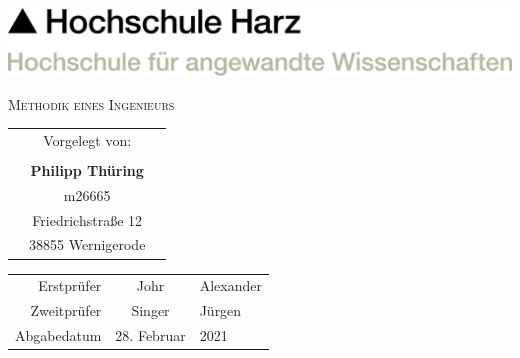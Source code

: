 
    \begin{center}   
        \includegraphics[width=0.5\paperwidth]{graphics/HSHARZ.png}
        \vspace{35mm}

        \Huge{\textsc{Methodik eines Ingenieurs}} 
        \normalsize
    
        \vspace{50mm}
    
        \begin{tabular}{r c l} 
            & Vorgelegt von: & \\
            && \\
            & \textbf{Philipp Thüring} &\\
             & m26665 & \\
             & Friedrichstraße 12 & \\
             & 38855 Wernigerode & \\
             
        \end{tabular}
    
        \vfill
        \begin{tabular}{r c l}
            Erstprüfer & Johr & Alexander \\
            Zweitprüfer & Singer & Jürgen \\
            Abgabedatum & 28. Februar & 2021 \\
        \end{tabular}
    
    
        
    
    \end{center}